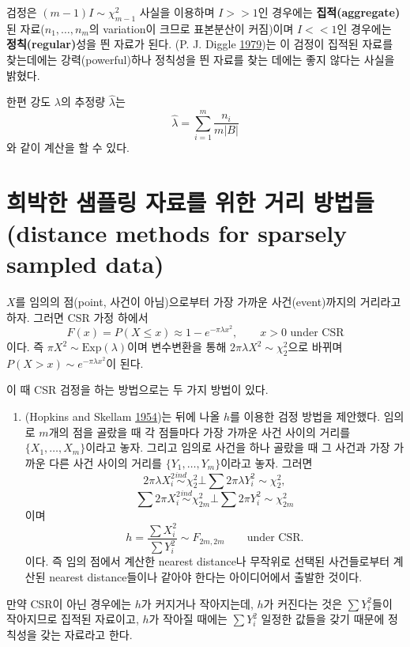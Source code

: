 \documentclass[b5paper,]{book}
\providecommand{\tightlist}{%
  \setlength{\itemsep}{0pt}\setlength{\parskip}{0pt}}
\theoremstyle{definition}
\theoremstyle{definition}
\theoremstyle{definition}
\theoremstyle{remark}
\begin{document}
검정은 \((m-1)I \sim \chi_{m-1}^{2}\) 사실을 이용하며 \(I >> 1\)인
경우에는 \textbf{집적(aggregate)}된 자료(\(n_{1}, \ldots, n_{m}\)의
variation이 크므로 표본분산이 커짐)이며 \(I << 1\)인 경우에는
\textbf{정칙(regular)}성을 띈 자료가 된다. (P. J. Diggle
\protect\hyperlink{ref-Diggle1979}{1979})는 이 검정이 집적된 자료를
찾는데에는 강력(powerful)하나 정칙성을 띈 자료를 찾는 데에는 좋지 않다는
사실을 밝혔다.

한편 강도 \(\lambda\)의 추정량 \(\hat{\lambda}\)는
\[\hat{\lambda}=\sum_{i=1}^{m}\frac{n_{i}}{m|B|}\] 와 같이 계산을 할 수
있다.

\section{희박한 샘플링 자료를 위한 거리 방법들(distance methods for
sparsely sampled
data)}\label{-----distance-methods-for-sparsely-sampled-data}

\(X\)를 임의의 점(point, 사건이 아님)으로부터 가장 가까운
사건(event)까지의 거리라고 하자. 그러면 CSR 가정 하에서
\[F(x)=P(X\leq x)\approx 1-e^{-\pi\lambda x^{2}}, \qquad{x>0\text{ under CSR}}\]
이다. 즉 \(\pi X^{2} \sim \text{Exp}(\lambda)\)이며 변수변환을 통해
\(2\pi \lambda X^{2} \sim \chi_{2}^{2}\)으로 바뀌며
\(P(X>x)\sim e^{-\pi\lambda x^{2}}\)이 된다.

이 때 CSR 검정을 하는 방법으로는 두 가지 방법이 있다.

\begin{enumerate}
\def\labelenumi{\arabic{enumi}.}
\tightlist
\item
  (Hopkins and Skellam \protect\hyperlink{ref-Hopkins1954}{1954})는 뒤에
  나올 \(h\)를 이용한 검정 방법을 제안했다. 임의로 \(m\)개의 점을 골랐을
  때 각 점들마다 가장 가까운 사건 사이의 거리를
  \(\{X_{1}, \ldots, X_{m}\}\)이라고 놓자. 그리고 임의로 사건을 하나
  골랐을 때 그 사건과 가장 가까운 다른 사건 사이의 거리를
  \(\{Y_{1}, \ldots, Y_{m}\}\)이라고 놓자. 그러면
  \[2\pi\lambda X_{i}^{2} \stackrel{ind}{\sim} \chi_{2}^{2} \bot \sum 2\pi\lambda Y_{i}^{2} \sim \chi_{2}^{2},\]
  \[\sum 2\pi X_{i}^{2} \stackrel{ind}{\sim} \chi_{2m}^{2} \bot \sum 2\pi Y_{i}^{2} \sim \chi_{2m}^{2}\]
  이며
  \[h=\frac{\sum X_{i}^{2}}{\sum Y_{i}^{2}} \sim F_{2m,2m} \qquad{\text{under CSR.}}\]
  이다. 즉 임의 점에서 계산한 nearest distance나 무작위로 선택된
  사건들로부터 계산된 nearest distance들이나 같아야 한다는 아이디어에서
  출발한 것이다.
\end{enumerate}

만약 CSR이 아닌 경우에는 \(h\)가 커지거나 작아지는데, \(h\)가 커진다는
것은 \(\sum Y_{i}^{2}\)들이 작아지므로 집적된 자료이고, \(h\)가 작아질
때에는 \(\sum Y_{i}^{2}\) 일정한 값들을 갖기 때문에 정칙성을 갖는
자료라고 한다.
\end{document}
